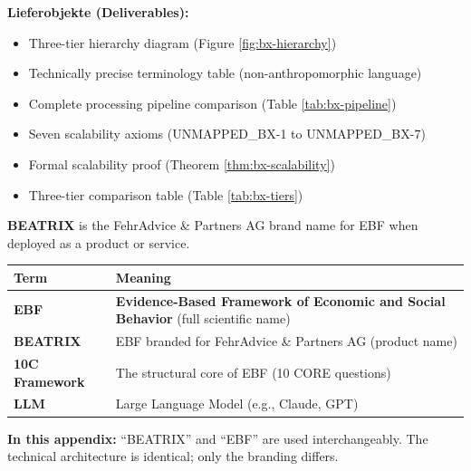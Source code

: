 \begin{tcolorbox}[
    colback=orange!5!white,
    colframe=orange!75!black,
    title={\textbf{Appendix Scope: Ziel / In-Scope / Out-of-Scope / Constraints}},
    fonttitle=\bfseries
]
\textbf{Lieferobjekte (Deliverables):}
\begin{itemize}[nosep]
    \item Three-tier hierarchy diagram (Figure \ref{fig:bx-hierarchy})
    \item Technically precise terminology table (non-anthropomorphic language)
    \item Complete processing pipeline comparison (Table \ref{tab:bx-pipeline})
    \item Seven scalability axioms (UNMAPPED_BX-1 to UNMAPPED_BX-7)
    \item Formal scalability proof (Theorem \ref{thm:bx-scalability})
    \item Three-tier comparison table (Table \ref{tab:bx-tiers})
\end{itemize}

\end{tcolorbox}



\begin{tcolorbox}[colback=blue!10!white, colframe=blue!75!black,
    title=\textbf{Naming Convention: BEATRIX = EBF}]

\textbf{BEATRIX} is the FehrAdvice \& Partners AG brand name for EBF when deployed as a product or service.

\begin{table}[H]
\centering
\renewcommand{\arraystretch}{1.3}
\begin{tabular}{@{}lp{9cm}@{}}
\toprule
\textbf{Term} & \textbf{Meaning} \\
\midrule
\textbf{EBF} & \textbf{Evidence-Based Framework of Economic and Social Behavior} (full scientific name) \\
\textbf{BEATRIX} & EBF branded for FehrAdvice \& Partners AG (product name) \\
\textbf{10C Framework} & The structural core of EBF (10 CORE questions) \\
\textbf{LLM} & Large Language Model (e.g., Claude, GPT) \\
\bottomrule
\end{tabular}
\end{table}

\textbf{In this appendix:} ``BEATRIX'' and ``EBF'' are used interchangeably. The technical architecture is identical; only the branding differs.

\end{tcolorbox}


